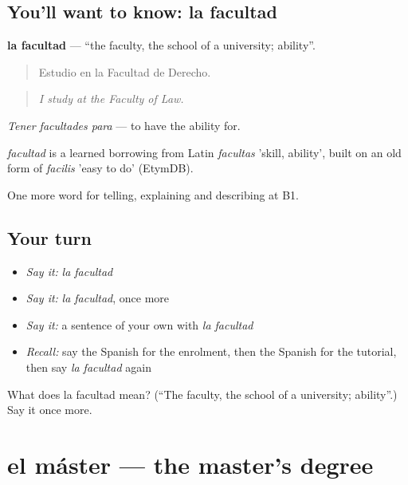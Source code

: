 \subsection*{You'll want to know: la facultad}
\textbf{la facultad} — \textquotedblleft{}the faculty, the school of a university; ability\textquotedblright{}.

\begin{quote}
Estudio en la Facultad de Derecho.
\end{quote}

\begin{quote}
\emph{I study at the Faculty of Law.}
\end{quote}

\emph{Tener facultades para} — to have the ability for.

\begin{cousinweb}
\emph{facultad} is a learned borrowing from Latin \emph{facultas} 'skill, ability', built on an old form of \emph{facilis} 'easy to do' (EtymDB).
\end{cousinweb}

\begin{grammarlens}[title={What you've built}]
One more word for telling, explaining and describing at B1.
\end{grammarlens}

\subsection*{Your turn}
\begin{itemize}
\raggedright
  \item \emph{Say it:} \emph{la facultad}
  \item \emph{Say it:} \emph{la facultad}, once more
  \item \emph{Say it:} a sentence of your own with \emph{la facultad}
  \item \emph{Recall:} say the Spanish for the enrolment, then the Spanish for the tutorial, then say \emph{la facultad} again
\end{itemize}

\begin{tcolorbox}[breakable,colback=teal!4,colframe=teal!35!black,title={Before you move on}]
What does la facultad mean? (\textquotedblleft{}The faculty, the school of a university; ability\textquotedblright{}.) Say it once more.
\end{tcolorbox}
\section[el máster]{el máster — the master's degree}

